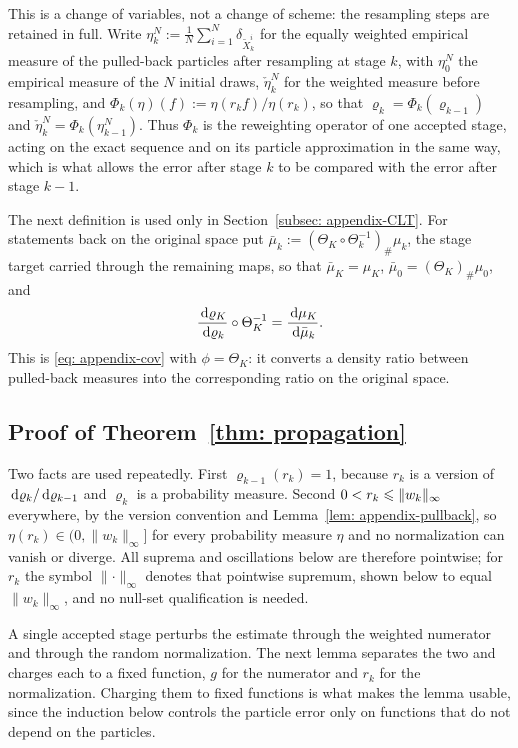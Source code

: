 \documentclass{article}
\begin{document}
This is a change of variables, not a change of scheme: the resampling steps are retained in full. Write $\eta_k^N := \frac1N\sum_{i=1}^{N}\delta_{\tilde X_k^i}$ for the equally weighted empirical measure of the pulled-back particles after resampling at stage $k$, with $\eta_0^N$ the empirical measure of the $N$ initial draws, $\check\eta_k^N$ for the weighted measure before resampling, and $\Phi_k(\eta)(f) := \eta(r_kf)/\eta(r_k)$, so that $\varrho_k = \Phi_k(\varrho_{k-1})$ and $\check\eta_k^N = \Phi_k(\eta_{k-1}^N)$. Thus $\Phi_k$ is the reweighting operator of one accepted stage, acting on the exact sequence and on its particle approximation in the same way, which is what allows the error after stage $k$ to be compared with the error after stage $k-1$.

The next definition is used only in Section~\ref{subsec: appendix-CLT}. For statements back on the original space put $\bar\mu_k := (\Theta_K\circ\Theta_k^{-1})_{\#}\mu_k$, the stage target carried through the remaining maps, so that $\bar\mu_K=\mu_K$, $\bar\mu_0 = (\Theta_K)_{\#}\mu_0$, and
\begin{equation}
    \frac{\,\mathrm d\varrho_K}{\,\mathrm d\varrho_k}\circ\Theta_K^{-1} = \frac{\,\mathrm d\mu_K}{\,\mathrm d\bar\mu_k}.
    \label{eq: appendix-carried}
\end{equation}
This is \eqref{eq: appendix-cov} with $\phi=\Theta_K$: it converts a density ratio between pulled-back measures into the corresponding ratio on the original space.

\subsection{Proof of Theorem~\ref{thm: propagation}}
\label{subsec: appendix-proof}

Two facts are used repeatedly. First $\varrho_{k-1}(r_k)=1$, because $r_k$ is a version of $\,\mathrm d\varrho_k/\,\mathrm d\varrho_{k-1}$ and $\varrho_k$ is a probability measure. Second $0<r_k\leqslant\lVert w_k\rVert_\infty$ everywhere, by the version convention and Lemma~\ref{lem: appendix-pullback}, so $\eta(r_k)\in(0,\lVert w_k\rVert_\infty]$ for every probability measure $\eta$ and no normalization can vanish or diverge. All suprema and oscillations below are therefore pointwise; for $r_k$ the symbol $\lVert\cdot\rVert_\infty$ denotes that pointwise supremum, shown below to equal $\lVert w_k\rVert_\infty$, and no null-set qualification is needed.

A single accepted stage perturbs the estimate through the weighted numerator and through the random normalization. The next lemma separates the two and charges each to a fixed function, $g$ for the numerator and $r_k$ for the normalization. Charging them to fixed functions is what makes the lemma usable, since the induction below controls the particle error only on functions that do not depend on the particles.
\end{document}
